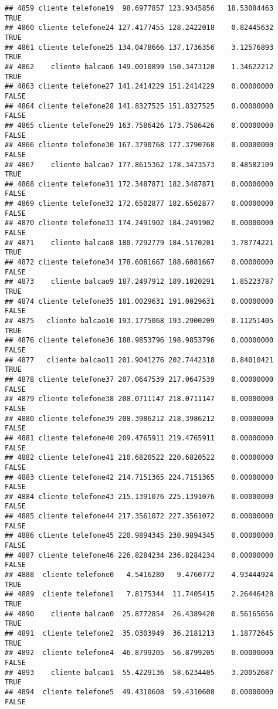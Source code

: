 \documentclass[
]{article}
\begin{document}
\begin{verbatim}
## 4859 cliente telefone19  98.6977857 123.9345856   18.53084463     TRUE
## 4860 cliente telefone24 127.4177455 128.2422018    0.82445632     TRUE
## 4861 cliente telefone25 134.0478666 137.1736356    3.12576893     TRUE
## 4862    cliente balcao6 149.0010899 150.3473120    1.34622212     TRUE
## 4863 cliente telefone27 141.2414229 151.2414229    0.00000000    FALSE
## 4864 cliente telefone28 141.8327525 151.8327525    0.00000000    FALSE
## 4865 cliente telefone29 163.7586426 173.7586426    0.00000000    FALSE
## 4866 cliente telefone30 167.3790768 177.3790768    0.00000000    FALSE
## 4867    cliente balcao7 177.8615362 178.3473573    0.48582109     TRUE
## 4868 cliente telefone31 172.3487871 182.3487871    0.00000000    FALSE
## 4869 cliente telefone32 172.6502877 182.6502877    0.00000000    FALSE
## 4870 cliente telefone33 174.2491902 184.2491902    0.00000000    FALSE
## 4871    cliente balcao8 180.7292779 184.5170201    3.78774221     TRUE
## 4872 cliente telefone34 178.6081667 188.6081667    0.00000000    FALSE
## 4873    cliente balcao9 187.2497912 189.1020291    1.85223787     TRUE
## 4874 cliente telefone35 181.0029631 191.0029631    0.00000000    FALSE
## 4875   cliente balcao10 193.1775068 193.2900209    0.11251405     TRUE
## 4876 cliente telefone36 188.9853796 198.9853796    0.00000000    FALSE
## 4877   cliente balcao11 201.9041276 202.7442318    0.84010421     TRUE
## 4878 cliente telefone37 207.0647539 217.0647539    0.00000000    FALSE
## 4879 cliente telefone38 208.0711147 218.0711147    0.00000000    FALSE
## 4880 cliente telefone39 208.3986212 218.3986212    0.00000000    FALSE
## 4881 cliente telefone40 209.4765911 219.4765911    0.00000000    FALSE
## 4882 cliente telefone41 210.6820522 220.6820522    0.00000000    FALSE
## 4883 cliente telefone42 214.7151365 224.7151365    0.00000000    FALSE
## 4884 cliente telefone43 215.1391076 225.1391076    0.00000000    FALSE
## 4885 cliente telefone44 217.3561072 227.3561072    0.00000000    FALSE
## 4886 cliente telefone45 220.9894345 230.9894345    0.00000000    FALSE
## 4887 cliente telefone46 226.8284234 236.8284234    0.00000000    FALSE
## 4888  cliente telefone0   4.5416280   9.4760772    4.93444924     TRUE
## 4889  cliente telefone1   7.8175344  11.7405415    2.26446428     TRUE
## 4890    cliente balcao0  25.8772854  26.4389420    0.56165656     TRUE
## 4891  cliente telefone2  35.0303949  36.2181213    1.18772645     TRUE
## 4892  cliente telefone4  46.8799205  56.8799205    0.00000000    FALSE
## 4893    cliente balcao1  55.4229136  58.6234405    3.20052687     TRUE
## 4894  cliente telefone5  49.4310608  59.4310608    0.00000000    FALSE

\end{verbatim}
\end{document}
